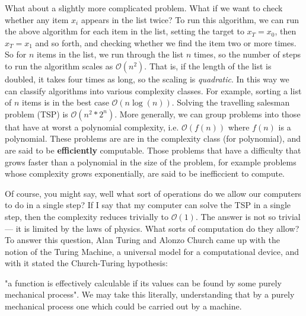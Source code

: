 What about a slightly more complicated problem. What if we want to check whether any item $x_i$ appears
in the list twice? To run this algorithm, we can run the above algorithm for each item in the list, setting the
target to $x_T = x_0$, then $x_T = x_1$ and so forth, and checking whether we find the item two or more
times. So for $n$ items in the list, we run through the list $n$ times, so the number of steps to run
the algorithm scales as $\mathcal{O}(n^2)$. That is, if the length of the list is doubled, it takes
four times as long, so the scaling is \emph{quadratic}.
In this way we can classify algorithms into various complexity classes. For example, sorting a list
of $n$ items is in the best case $\mathcal{O}(n \log(n))$. Solving the travelling salesman problem (TSP) is
$\mathcal{O}(n^2*2^n)$. More generally, we can group problems into those that have at worst a polynomial
complexity, i.e. $\mathcal{O}\left(f(n)\right)$ where $f(n)$ is a polynomial. These problems are are
in the complexity class  (for polynomial), and are said to be \textbf{efficiently} computable.
Those problems that have a difficulty that grows faster than a polynomial in the size of the problem, 
for example problems whose complexity grows exponentially, are said to be inefficcient to compute.

Of course, you might say, well what sort of operations do we allow our computers to do in a single step?
If I say that my computer can solve the TSP in a single step, then the complexity reduces trivially to
$\mathcal{O}(1)$. The answer is not so trivial --- it is limited by the laws of physics. What sorts
of computation do they allow? To answer this question, Alan Turing and Alonzo Church came up with the notion of 
the Turing Machine, a universal model for a computational device, and with it stated the Church-Turing 
hypothesis:

\begin{displayquote}
  "a function is effectively calculable if its values can be found by some purely mechanical process". 
  We may take this literally, understanding that by a purely mechanical process one which could be carried out by a machine.
\end{displayquote}

